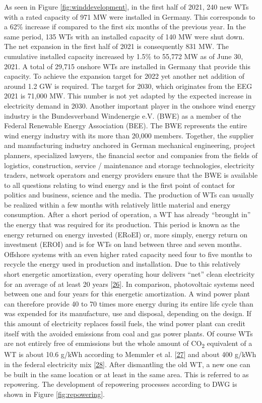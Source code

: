 \documentclass[a4paper,11pt]{article}
\begin{document}
As seen in Figure \ref{fig:winddevelopment}, in the first half of 2021, 240 new WTs with a rated capacity of 971 MW were installed in Germany. This corresponds to a 62\% increase if compared to the first six months of the previous year. In the same period, 135 WTs with an installed capacity of 140 MW were shut down. The net expansion in the first half of 2021 is consequently 831 MW. The cumulative installed capacity increased by 1.5\% to 55,772 MW as of June 30, 2021. A total of 29,715 onshore WTs are installed in Germany that provide this capacity. To achieve the expansion target for 2022 yet another net addition of around 1.2 GW is required. The target for 2030, which originates from the EEG 2021 is 71,000 MW. This number is not yet adapted by the expected increase in electricity demand in 2030. Another important player in the onshore wind energy industry is the Bundesverband Windenergie e.V. (BWE) as a member of the Federal Renewable Energy Association (BEE). The BWE represents the entire wind energy industry with its more than 20,000 members. Together, the supplier and manufacturing industry anchored in German mechanical engineering, project planners, specialized lawyers, the financial sector and companies from the fields of logistics, construction, service / maintenance and storage technologies, electricity traders, network operators and energy providers ensure that the BWE is available to all questions relating to wind energy and is the first point of contact for politics and business, science and the media. The production of WTs can usually be realized within a few months with relatively little material and energy consumption. After a short period of operation, a WT has already ``brought in'' the energy that was required for its production. This period is known as the energy returned on energy invested (ERoEI) or, more simply, energy return on investment (EROI) and is for WTs on land between three and seven months. Offshore systems with an even higher rated capacity need four to five months to recycle the energy used in production and installation. Due to this relatively short energetic amortization, every operating hour delivers ``net'' clean electricity for an average of at least 20 years {[}\protect\hyperlink{ref-PriyanaRazdan.2019}{26}{]}. In comparison, photovoltaic systems need between one and four years for this energetic amortization. A wind power plant can therefore provide 40 to 70 times more energy during its entire life cycle than was expended for its manufacture, use and disposal, depending on the design. If this amount of electricity replaces fossil fuels, the wind power plant can credit itself with the avoided emissions from coal and gas power plants. Of course WTs are not entirely free of emmissions but the whole amount of CO\textsubscript{2} equivalent of a WT is about 10.6 g/kWh according to Memmler et al. {[}\protect\hyperlink{ref-M.MemmlerDr.T.LaufS.Schneider.2017}{27}{]} and about 400 g/kWh in the federal electricity mix {[}\protect\hyperlink{ref-Umweltbundesamt.2021}{28}{]}. After dismantling the old WT, a new one can be built in the same location or at least in the same area. This is referred to as repowering. The development of repowering processes according to DWG is shown in Figure \ref{fig:repowering}.
\end{document}
